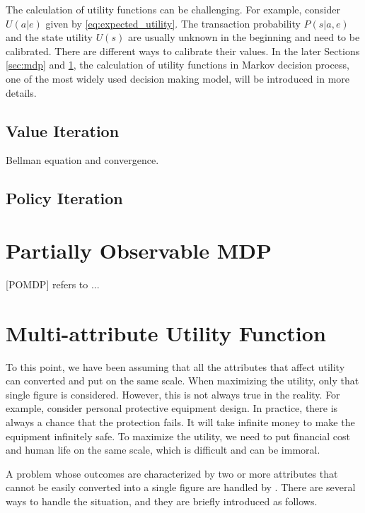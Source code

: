 The calculation of utility functions can be challenging. For example, consider $U(a|e)$ given by \eqref{eq:expected_utility}. The transaction probability $P(s|a,e)$ and the state utility $U(s)$ are usually unknown in the beginning and need to be calibrated. There are different ways to calibrate their values. In the later Sections \ref{sec:mdp} and \ref{sec:pomdp}, the calculation of utility functions in Markov decision process, one of the most widely used decision making model, will be introduced in more details.

\subsection{Value Iteration}

Bellman equation and convergence.

\subsection{Policy Iteration}

\section{Partially Observable MDP} \label{sec:pomdp}

[POMDP] refers to ...

\section{Multi-attribute Utility Function}

To this point, we have been assuming that all the attributes that affect utility can converted and put on the same scale. When maximizing the utility, only that single figure is considered. However, this is not always true in the reality. For example, consider personal protective equipment design. In practice, there is always a chance that the protection fails. It will take infinite money to make the equipment infinitely safe. To maximize the utility, we need to put financial cost and human life on the same scale, which is difficult and can be immoral.

A problem whose outcomes are characterized by two or more attributes that cannot be easily converted into a single figure are handled by . There are several ways to handle the situation, and they are briefly introduced as follows.

